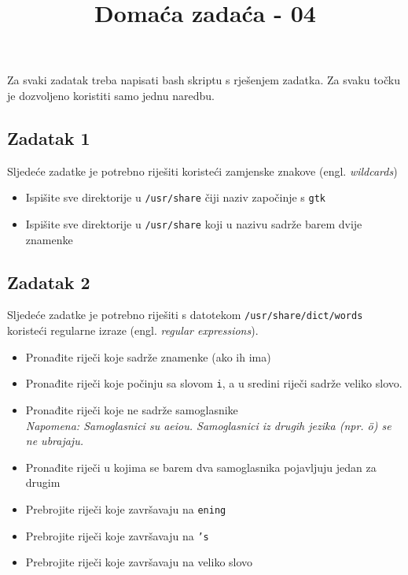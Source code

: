\documentclass[12pt,a4paper]{article}
\newcommand{\shell}[1]{\texttt{#1}}
\begin{document}
	\title{Domaća zadaća - 04\vspace{-2em}}
	\maketitle
	Za svaki zadatak treba napisati bash skriptu s rješenjem zadatka. Za svaku točku je dozvoljeno koristiti samo jednu naredbu.
	
	\subsection*{Zadatak 1}
	Sljedeće zadatke je potrebno riješiti koristeći zamjenske znakove (engl. \emph{wildcards})
	\begin{itemize}	
		\item Ispišite sve direktorije u \shell{/usr/share} čiji naziv započinje s \shell{gtk}
		\item Ispišite sve direktorije u \shell{/usr/share} koji u nazivu sadrže barem dvije znamenke
	\end{itemize}
	
	\subsection*{Zadatak 2}
	Sljedeće zadatke je potrebno riješiti s datotekom \shell{/usr/share/dict/words} koristeći regularne izraze (engl. \emph{regular expressions}).
	\begin{itemize}
		\item Pronađite riječi koje sadrže znamenke (ako ih ima)
		\item Pronađite riječi koje počinju sa slovom \shell{i}, a u sredini riječi sadrže veliko slovo.
		\item Pronađite riječi koje ne sadrže samoglasnike \\ \emph{Napomena: Samoglasnici su aeiou. Samoglasnici iz drugih jezika (npr. ö) se ne ubrajaju.}
		\item Pronađite riječi u kojima se barem dva samoglasnika pojavljuju jedan za drugim
		\item Prebrojite riječi koje završavaju na \shell{ening}
		\item Prebrojite riječi koje završavaju na \shell{'s}
		\item Prebrojite riječi koje završavaju na veliko slovo
	\end{itemize}
	
\end{document}
